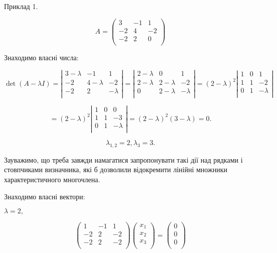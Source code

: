 Приклад 1.

$$A = \begin{pmatrix}
	 3 & -1 &  1 \\
	-2 &  4 & -2 \\
	-2 &  2 &  0 \\
\end{pmatrix} $$

Знаходимо власні числа:

$$\det(A - \lambda I) = \left| \begin{matrix}
	3 - \lambda & -1          & 1 \\
	-2          & 4 - \lambda & -2 \\
	-2          & 2           & -\lambda\\
\end{matrix} \right| = \left| \begin{matrix}
	2 - \lambda & 0           & 1 \\
	2 - \lambda & 2 - \lambda & -2 \\
	0           & 2 - \lambda & -\lambda\\
\end{matrix} \right| = (2 - \lambda)^2 \left| \begin{matrix}
	1 & 0 & 1 \\
	1 & 1 & -2 \\
	0 & 1 & -\lambda\\
\end{matrix} \right|$$

$$= (2 - \lambda)^2 \left| \begin{matrix}
	1 & 0 & 0 \\
	1 & 1 & -3 \\
	0 & 1 & -\lambda\\
\end{matrix} \right|
= (2 - \lambda)^2 (3 - \lambda) = 0.$$

$$\lambda_{1,2} = 2, \lambda_{3} = 3.$$

Зауважимо, що треба завжди намагатися запропонувати такі дії над
рядками і стовпчиками визначника, які б дозволили відокремити лінійні
множники характеристичного многочлена.

Знаходимо власні вектори: 

$\lambda = 2,$

$$\begin{pmatrix}
	 1 & -1 &  1 \\
	-2 &  2 & -2 \\
	-2 &  2 & -2 \\
\end{pmatrix} \begin{pmatrix}
	x_1 \\
	x_2 \\
	x_3 \\
\end{pmatrix} = \begin{pmatrix}
	0 \\
	0 \\
	0 \\
\end{pmatrix} $$

